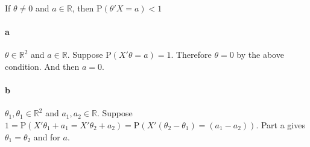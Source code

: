 \documentclass[11pt,letterpaper]{article}                  %
\begin{document}
\bigskip
\begin{problem}
If $\theta \neq 0$ and $a \in \mathbb{R}$, then
$\mathrm{P}(\theta' X = a) < 1$
\paragraph*{a}
$\theta \in \mathbb{R}^2$ and $a \in \mathbb{R}$. Suppose
$\mathrm{P}(X'\theta = a) = 1$. Therefore $\theta = 0$ by the above
condition. And then $a = 0$.

\paragraph*{b}
$\theta_1,\theta_1 \in \mathbb{R}^2$ and $a_1,a_2 \in
\mathbb{R}$. Suppose $1 = \mathrm{P}(X'\theta_1 + a_1 = X'\theta_2 +
a_2) = \mathrm{P}\left(X'(\theta_2-\theta_1) = (a_1-a_2)\right)$. Part
a gives $\theta_1 = \theta_2$ and for $a$.
\end{problem}
\end{document}
